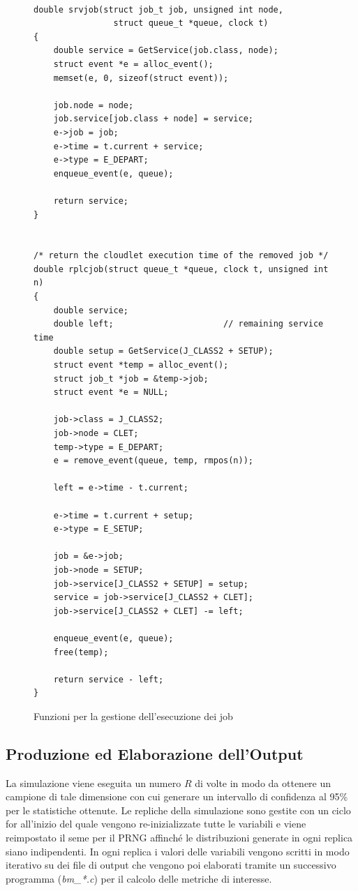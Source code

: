 \begin{figure}[!h]
\begin{lstlisting}[title=cloudq.c]

double srvjob(struct job_t job, unsigned int node,
                struct queue_t *queue, clock t)
{
    double service = GetService(job.class, node);
    struct event *e = alloc_event();
    memset(e, 0, sizeof(struct event));

    job.node = node;
    job.service[job.class + node] = service;
    e->job = job;
    e->time = t.current + service;
    e->type = E_DEPART;
    enqueue_event(e, queue);

    return service;
}


/* return the cloudlet execution time of the removed job */
double rplcjob(struct queue_t *queue, clock t, unsigned int n)
{
    double service;
    double left;                      // remaining service time
    double setup = GetService(J_CLASS2 + SETUP);
    struct event *temp = alloc_event();
    struct job_t *job = &temp->job;
    struct event *e = NULL;
    
    job->class = J_CLASS2;
    job->node = CLET;
    temp->type = E_DEPART;
    e = remove_event(queue, temp, rmpos(n));
    
    left = e->time - t.current;     

    e->time = t.current + setup;
    e->type = E_SETUP;

    job = &e->job;
    job->node = SETUP;
    job->service[J_CLASS2 + SETUP] = setup;
    service = job->service[J_CLASS2 + CLET];
    job->service[J_CLASS2 + CLET] -= left;

    enqueue_event(e, queue);
    free(temp);

    return service - left;
}
\end{lstlisting}
\caption{Funzioni per la gestione dell'esecuzione dei job}
\label{code:srvhdlr}
\end{figure}
%
%
\subsection{Produzione ed Elaborazione dell'Output}
La simulazione viene eseguita un numero $R$ di volte in modo da ottenere un
campione di tale dimensione con cui generare un intervallo di confidenza al 95\%
per le statistiche ottenute.  Le repliche della simulazione sono gestite con
un ciclo for all’inizio del quale vengono re-inizializzate tutte le variabili e
viene reimpostato il seme per il PRNG affinché le distribuzioni generate in ogni
replica siano indipendenti. In ogni replica i valori delle variabili
vengono scritti in modo iterativo su dei file di output che vengono poi
elaborati tramite un successivo programma (\emph{bm\_*.c}) per il calcolo delle
metriche di interesse.
